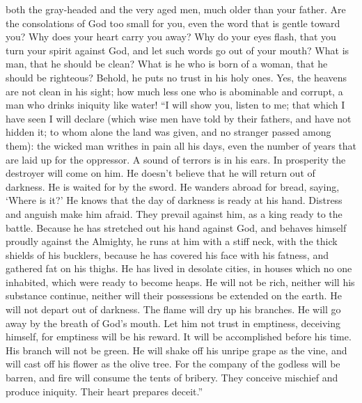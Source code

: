 both the gray-headed and the very aged men, much older than your father.
 Are the consolations of God too small for you, even the
word that is gentle toward you?  Why does your heart carry
you away? Why do your eyes flash,  that you turn your
spirit against God, and let such words go out of your mouth?
 What is man, that he should be clean? What is he who is
born of a woman, that he should be righteous?  Behold, he
puts no trust in his holy ones. Yes, the heavens are not clean in his
sight;  how much less one who is abominable and corrupt, a
man who drinks iniquity like water!  ``I will show you,
listen to me; that which I have seen I will declare  (which
wise men have told by their fathers, and have not hidden it;
 to whom alone the land was given, and no stranger passed
among them):  the wicked man writhes in pain all his days,
even the number of years that are laid up for the oppressor.
 A sound of terrors is in his ears. In prosperity the
destroyer will come on him.  He doesn't believe that he
will return out of darkness. He is waited for by the sword.
 He wanders abroad for bread, saying, `Where is it?' He
knows that the day of darkness is ready at his hand. 
Distress and anguish make him afraid. They prevail against him, as a
king ready to the battle.  Because he has stretched out his
hand against God, and behaves himself proudly against the Almighty,
 he runs at him with a stiff neck, with the thick shields
of his bucklers,  because he has covered his face with his
fatness, and gathered fat on his thighs.  He has lived in
desolate cities, in houses which no one inhabited, which were ready to
become heaps.  He will not be rich, neither will his
substance continue, neither will their possessions be extended on the
earth.  He will not depart out of darkness. The flame will
dry up his branches. He will go away by the breath of God's mouth.
 Let him not trust in emptiness, deceiving himself, for
emptiness will be his reward.  It will be accomplished
before his time. His branch will not be green.  He will
shake off his unripe grape as the vine, and will cast off his flower as
the olive tree.  For the company of the godless will be
barren, and fire will consume the tents of bribery.  They
conceive mischief and produce iniquity. Their heart prepares deceit.''
